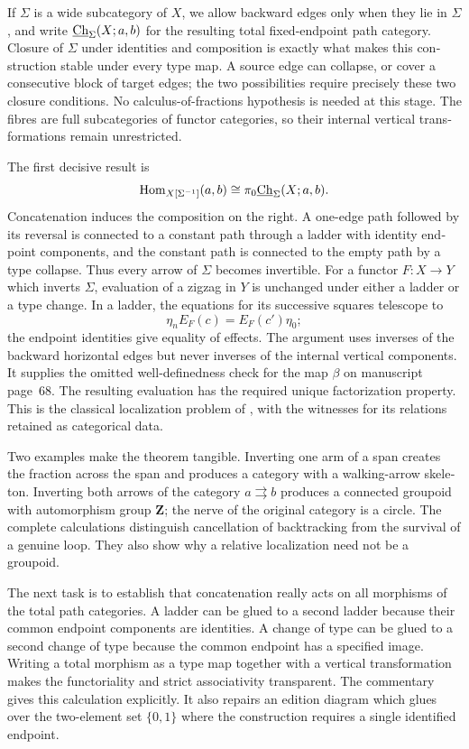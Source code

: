\begin{otherlanguage}{english}
If $\Sigma$ is a wide subcategory of $X$, we allow backward edges only when they lie in $\Sigma$, and write $\underline{\mathrm{Ch}}_\Sigma(X;a,b)$ for the resulting total fixed-endpoint path category.  Closure of $\Sigma$ under identities and composition is exactly what makes this construction stable under every type map.  A source edge can collapse, or cover a consecutive block of target edges; the two possibilities require precisely these two closure conditions.  No calculus-of-fractions hypothesis is needed at this stage.  The fibres are full subcategories of functor categories, so their internal vertical transformations remain unrestricted.

The first decisive result is
\[
 \operatorname{Hom}_{X[\Sigma^{-1}]}(a,b)
      \cong \pi_0\underline{\mathrm{Ch}}_\Sigma(X;a,b).
\]
Concatenation induces the composition on the right.  A one-edge path followed by its reversal is connected to a constant path through a ladder with identity endpoint components, and the constant path is connected to the empty path by a type collapse.  Thus every arrow of $\Sigma$ becomes invertible.  For a functor $F:X\to Y$ which inverts $\Sigma$, evaluation of a zigzag in $Y$ is unchanged under either a ladder or a type change.  In a ladder, the equations for its successive squares telescope to
\[
 \eta_n E_F(c)=E_F(c')\eta_0;
\]
the endpoint identities give equality of effects.  The argument uses inverses of the backward horizontal edges but never inverses of the internal vertical components.  It supplies the omitted well-definedness check for the map $\beta$ on manuscript page~68.  The resulting evaluation has the required unique factorization property.  This is the classical localization problem of \citet[Chapter~I, \S1]{GabrielZisman1967}, with the witnesses for its relations retained as categorical data.

Two examples make the theorem tangible.  Inverting one arm of a span creates the fraction across the span and produces a category with a walking-arrow skeleton.  Inverting both arrows of the category $a\rightrightarrows b$ produces a connected groupoid with automorphism group $\mathbf Z$; the nerve of the original category is a circle.  The complete calculations distinguish cancellation of backtracking from the survival of a genuine loop.  They also show why a relative localization need not be a groupoid.

The next task is to establish that concatenation really acts on all morphisms of the total path categories.  A ladder can be glued to a second ladder because their common endpoint components are identities.  A change of type can be glued to a second change of type because the common endpoint has a specified image.  Writing a total morphism as a type map together with a vertical transformation makes the functoriality and strict associativity transparent.  The commentary gives this calculation explicitly.  It also repairs an edition diagram which glues over the two-element set $\{0,1\}$ where the construction requires a single identified endpoint.


\end{otherlanguage}
